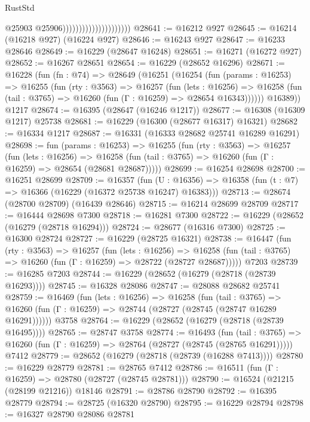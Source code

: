 \begin{lexlean}{RustStd}
\begin{coremodule}
                                              @25903
                                              @25906)))))))))))))))))))))
@28641 := @16212 @927
@28645 := @16214 (@16218 @927) (@16224 @927)
@28646 := @16243 @927
@28647 := @16233 @28646
@28649 := @16229 (@28647 @16248)
@28651 := @16271 (@16272 @927)
@28652 := @16267 @28651
@28654 := @16229 (@28652 @16296)
@28671 := @16228
    (fun (fn : @74) =>
    @28649
      (@16251
        (@16254
          (fun (params : @16253) =>
          @16255
            (fun (rty : @3563) =>
            @16257
              (fun (lets : @16256) =>
              @16258 (fun (tail : @3765) => @16260 (fun (Γ : @16259) => @28654 @16343))))))
        @16389))
    @1217
@28674 := @16395 (@28647 (@16246 @1217))
@28677 := @16308 (@16309 @1217) @25738
@28681 := @16229 (@16300 (@28677 @16317) @16321)
@28682 := @16334 @1217
@28687 := @16331 (@16333 @28682 @25741 @16289 @16291)
@28698 := fun (params : @16253) =>
  @16255
    (fun (rty : @3563) =>
    @16257
      (fun (lets : @16256) =>
      @16258 (fun (tail : @3765) => @16260 (fun (Γ : @16259) => @28654 (@28681 @28687)))))
@28699 := @16254 @28698
@28700 := @16251 @28699
@28709 := @16357
    (fun (U : @16356) => @16358 (fun (t : @7) => @16366 (@16229 (@16372 @25738 @16247) @16383)))
@28713 := @28674 (@28700 @28709) (@16439 @28646)
@28715 := @16214 @28699 @28709
@28717 := @16444 @28698 @7300
@28718 := @16281 @7300
@28722 := @16229 (@28652 (@16279 (@28718 @16294)))
@28724 := @28677 (@16316 @7300)
@28725 := @16300 @28724
@28727 := @16229 (@28725 @16321)
@28738 := @16447
    (fun (rty : @3563) =>
    @16257
      (fun (lets : @16256) =>
      @16258 (fun (tail : @3765) => @16260 (fun (Γ : @16259) => @28722 (@28727 @28687)))))
    @7203
@28739 := @16285 @7203
@28744 := @16229 (@28652 (@16279 (@28718 (@28739 @16293))))
@28745 := @16328 @28086
@28747 := @28088 @28682 @25741
@28759 := @16469
    (fun (lets : @16256) =>
    @16258
      (fun (tail : @3765) =>
      @16260 (fun (Γ : @16259) => @28744 (@28727 (@28745 (@28747 @16289 @16291))))))
    @3758
@28764 := @16229 (@28652 (@16279 (@28718 (@28739 @16495))))
@28765 := @28747 @3758
@28774 := @16493
    (fun (tail : @3765) => @16260 (fun (Γ : @16259) => @28764 (@28727 (@28745 (@28765 @16291)))))
    @7412
@28779 := @28652 (@16279 (@28718 (@28739 (@16288 @7413))))
@28780 := @16229 @28779
@28781 := @28765 @7412
@28786 := @16511 (fun (Γ : @16259) => @28780 (@28727 (@28745 @28781)))
@28790 := @16524 (@21215 (@28199 @21216)) @18146
@28791 := @28786 @28790
@28792 := @16395 @28779
@28794 := @28725 (@16320 @28790)
@28795 := @16229 @28794
@28798 := @16327 @28790 @28086 @28781

\end{coremodule}
\end{lexlean}
